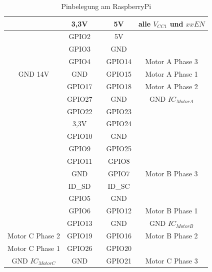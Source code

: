\documentclass[12pt,a4paper,bibliography=totocnumbered,listof=totocnumbered]{scrartcl}
\begin{document}
\begin{table}[htp] 
	\centering 
	\begin{tabular}{|c||c|c|c||c|}
		\hline 
		& 3,3V &  & 5V & alle $V_{CC1}$ und $xxEN$ \\ 
		\hline 
		& GPIO2 &  & 5V &  \\ 
		\hline 
		& GPIO3 &  & GND &  \\ 
		\hline 
		& GPIO4 &  & GPIO14 & Motor A Phase 3 \\ 
		\hline 
		GND 14V& GND &  & GPIO15 & Motor A Phase 1 \\ 
		\hline 
		& GPIO17 &  & GPIO18 & Motor A Phase 2 \\ 
		\hline 
		& GPIO27 &  & GND & GND $IC_{MotorA}$ \\ 
		\hline 
		& GPIO22 &  & GPIO23 &  \\ 
		\hline 
		& 3,3V &  & GPIO24 &  \\ 
		\hline 
		& GPIO10 &  & GND &  \\ 
		\hline 
		& GPIO9 &  & GPIO25 &  \\ 
		\hline 
		& GPIO11 &  & GPIO8 &  \\ 
		\hline 
		& GND &  & GPIO7 & Motor B Phase 3 \\ 
		\hline 
		& ID\_SD &  & ID\_SC &  \\ 
		\hline 
		& GPIO5 &  & GND &  \\ 
		\hline 
		& GPIO6 &  & GPIO12 & Motor B Phase 1 \\ 
		\hline 
		& GPIO13 &  & GND & GND $IC_{MotorB}$ \\ 
		\hline 
		Motor C Phase 2& GPIO19 &  & GPIO16 & Motor B Phase 2 \\ 
		\hline 
		Motor C Phase 1& GPIO26 &  & GPIO20 &  \\ 
		\hline 
		GND $IC_{MotorC}$& GND &  & GPIO21 & Motor C Phase 3 \\ 
		\hline 
	\end{tabular} 
	\caption{Pinbelegung am RaspberryPi} 
	\label{tab:pins}
\end{table}
\end{document}
